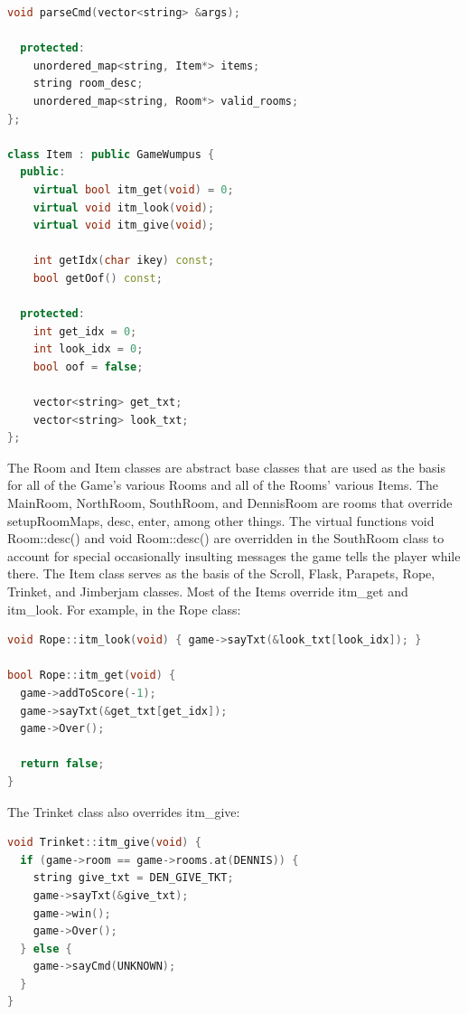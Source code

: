 \documentclass[man,12pt]{apa6}
\begin{document}
\begin{singlespace}
\begin{framed}
\begin{lstlisting}[language=C++]
    void parseCmd(vector<string> &args);

  protected:
    unordered_map<string, Item*> items;
    string room_desc;
    unordered_map<string, Room*> valid_rooms;
};

class Item : public GameWumpus {
  public:
    virtual bool itm_get(void) = 0;
    virtual void itm_look(void);
    virtual void itm_give(void);

    int getIdx(char ikey) const;
    bool getOof() const;

  protected:
    int get_idx = 0;
    int look_idx = 0;
    bool oof = false;

    vector<string> get_txt;
    vector<string> look_txt;
};
\end{lstlisting}
\end{framed}
\end{singlespace}

The \textsf{Room} and \textsf{Item} classes are abstract base classes that are
used as the basis for all of the \textsf{Game}'s various \textsf{Room}s and all
of the \textsf{Room}s' various \textsf{Item}s.  The \textsf{MainRoom},
\textsf{NorthRoom}, \textsf{SouthRoom}, and \textsf{DennisRoom} are rooms that
override \textsf{setupRoomMaps}, \textsf{desc}, \textsf{enter}, among other
things.  The \textsf{virtual} functions \textsf{void Room::desc()} and
\textsf{void Room::desc()} are overridden in the \textsf{SouthRoom} class to
account for special occasionally insulting messages the game tells the player
while there.  The \textsf{Item} class serves as the basis of the \textsf{Scroll},
\textsf{Flask}, \textsf{Parapets}, \textsf{Rope}, \textsf{Trinket}, and
\textsf{Jimberjam} classes.  Most of the \textsf{Item}s override
\textsf{itm\_get} and \textsf{itm\_look}.  For example, in the \textsf{Rope}
class:

\begin{framed}
\begin{lstlisting}[language=C++]
void Rope::itm_look(void) { game->sayTxt(&look_txt[look_idx]); }

bool Rope::itm_get(void) {
  game->addToScore(-1);
  game->sayTxt(&get_txt[get_idx]);
  game->Over();

  return false;
}
\end{lstlisting}
\end{framed}

The \textsf{Trinket} class also overrides \textsf{itm\_give}:

\begin{framed}
\begin{lstlisting}[language=C++]
void Trinket::itm_give(void) {
  if (game->room == game->rooms.at(DENNIS)) {
    string give_txt = DEN_GIVE_TKT;
    game->sayTxt(&give_txt);
    game->win();
    game->Over();
  } else {
    game->sayCmd(UNKNOWN);
  }
}
\end{lstlisting}
\end{framed}
\end{document}
